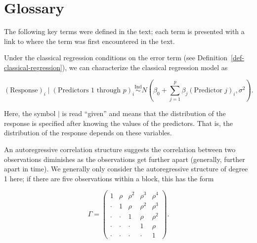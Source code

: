 \documentclass[
  letterpaper,
  DIV=11,
  numbers=noendperiod]{scrreprt}
\providecommand{\tightlist}{%
  \setlength{\itemsep}{0pt}\setlength{\parskip}{0pt}}\usepackage{longtable,booktabs,array}
\theoremstyle{definition}
\theoremstyle{definition}
\theoremstyle{remark}
\begin{document}
\cleardoublepage
{}
{}
\appendix

\hypertarget{glossary}{%
\chapter{Glossary}\label{glossary}}

\providecommand{\norm}[1]{\lVert#1\rVert}
\providecommand{\abs}[1]{\lvert#1\rvert}
\providecommand{\dist}[1]{\stackrel{\text{#1}}{\sim}}
\providecommand{\ind}[1]{\mathbb{I}\left(#1\right)}
\providecommand{\bm}[1]{\mathbf{#1}}
\providecommand{\bs}[1]{\boldsymbol{#1}}
\providecommand{\Ell}{\mathcal{L}}
\providecommand{\indep}{\perp\negthickspace\negmedspace\perp}

The following key terms were defined in the text; each term is presented
with a link to where the term was first encountered in the text.

\begin{description}
\tightlist
\item[Alternate Characterization of the Classical Regression Model
(Definition~\ref{def-alternate-characterization})]
Under the classical regression conditions on the error term (see
Definition~\ref{def-classical-regression}), we can characterize the
classical regression model as
\end{description}

\[(\text{Response})_i \mid (\text{Predictors 1 through } p)_i \stackrel{\text{Ind}}{\sim} N\left(\beta_0 + \sum\limits_{j=1}^{p} \beta_j (\text{Predictor } j)_i, \sigma^2\right).\]

Here, the symbol \(\mid\) is read ``given'' and means that the
distribution of the response is specified after knowing the values of
the predictors. That is, the distribution of the response depends on
these variables.

\begin{description}
\tightlist
\item[Autoregressive Correlation Structure
(Definition~\ref{def-autoregressive-correlation-structure})]
An autoregressive correlation structure suggests the correlation between
two observations diminishes as the observations get further apart
(generally, further apart in time). We generally only consider the
autoregressive structure of degree 1 here; if there are five
observations within a block, this has the form
\end{description}

\[\Gamma = \begin{pmatrix} 
1 & \rho & \rho^2 & \rho^3 & \rho^4 \\
\cdot & 1 & \rho & \rho^2 & \rho^3 \\
\cdot & \cdot & 1 & \rho & \rho^2 \\
\cdot & \cdot & \cdot & 1 & \rho \\
\cdot & \cdot & \cdot & \cdot & 1 \end{pmatrix}.\]
\end{document}
